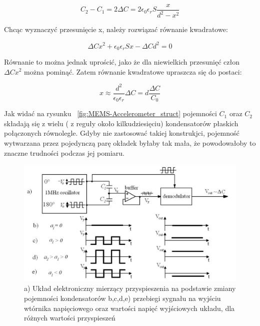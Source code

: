 \begin{equation}
	C_2 - C_1 = 2\Delta{C} = 2\epsilon_0\epsilon_rS\frac{x}{d^2 - x^2}
\end{equation}

Chcąc wyznaczyć przesunięcie x, należy rozwiązać równanie kwadratowe:

\begin{equation}
	\Delta{C}x^2 + \epsilon_0\epsilon_rSx - \Delta{C}d^2 = 0
\end{equation}

Równanie to można jednak uprościć, jako że dla niewielkich przesunięć człon $\Delta{C}x^2$ można pominąć. Zatem równanie kwadratowe upraszcza się do postaci:

\begin{equation}
	x \approx \frac{d^2}{\epsilon_0\epsilon_r}\Delta{C} = d\frac{\Delta{C}}{C_0}
	\label{x_to_c}
\end{equation}

Jak widać na rysunku ~\ref{fig:MEMS-Accelerometer_struct} pojemności $C_1$ oraz $C_2$ składają się z wielu ( z reguły około kilkudziesięciu)  kondensatorów płaskich połączonych równolegle. Gdyby nie zastosować takiej konstrukjci, pojemność wytwarzana przez pojedynczą parę okładek byłaby tak mała, że powodowałoby to znaczne trudności podczas jej pomiaru. 

\begin{figure}[H]
	\centering
	\includegraphics[scale=0.4]{Pictures/MEMS_accel_demod.png}
		\caption[Układ elektroniczny do pomiaru różnicy pojemności kondensatorów]{a) Układ elektroniczny mierzący przyspieszenia na podstawie zmiany pojemności kondensatorów b,c,d,e) przebiegi sygnału na wyjściu wtórnika napięciowego oraz wartości napięć wyjściowych układu, dla różnych wartości przyspieszeń }
	\label{fig:MEMS_accel_demod}
\end{figure}

